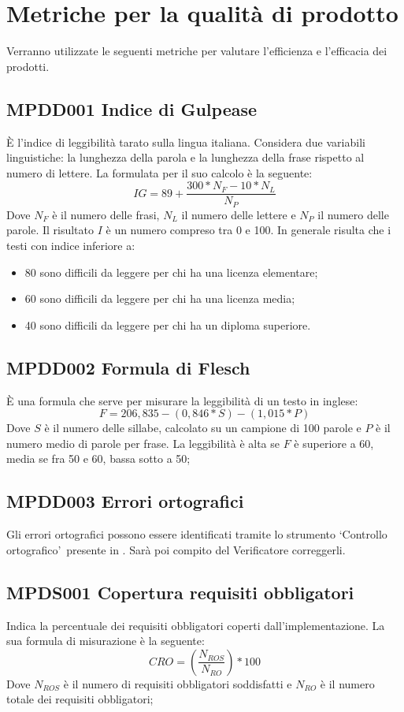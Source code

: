 \documentclass[NormeDiProgetto.tex]{subfiles}
\begin{document}
\section{Metriche per la qualità di prodotto}
Verranno utilizzate le seguenti metriche per valutare l'efficienza e l'efficacia dei prodotti.
\subsection{MPDD001 Indice di Gulpease} \`{E} l'indice di leggibilità tarato sulla lingua italiana. Considera due variabili linguistiche: la lunghezza della parola e la lunghezza della frase rispetto al numero di lettere. La formulata per il suo calcolo è la seguente:
\[IG=89+\dfrac{300*N_F-10*N_L}{N_P}\] Dove $ N_F $ è il numero delle frasi, $ N_L $ il numero delle lettere e $ N_P $ il numero delle parole. Il risultato $I$ è un numero compreso tra 0 e 100. In generale risulta che i testi con indice inferiore a:
\begin{itemize}
	\item 80 sono difficili da leggere per chi ha una licenza elementare;
	\item 60 sono difficili da leggere per chi ha una licenza media;
	\item 40 sono difficili da leggere per chi ha un diploma superiore.
\end{itemize}	
\subsection {MPDD002 Formula di Flesch} \`{E} una formula che serve per misurare la leggibilità di un testo in inglese:
\[F=206,835-(0,846*S)-(1,015*P)\] Dove $ S $ è il numero delle sillabe, calcolato su un campione di 100 parole e $ P $ è il numero medio di parole per frase.
La leggibilità è alta se $F$ è superiore a 60, media se fra 50 e 60, bassa sotto a 50;
\subsection{MPDD003 Errori ortografici} Gli errori ortografici possono essere identificati tramite lo strumento \textquoteleft Controllo ortografico\textquoteright\ presente in . Sarà poi compito del Verificatore correggerli.  	


\subsection{MPDS001 Copertura requisiti obbligatori} Indica la percentuale dei requisiti obbligatori coperti dall'implementazione. La sua formula di misurazione è la seguente: \[CRO=(\frac{N_{ROS}}{N_{RO}})*100\] Dove $ N_{ROS} $ è il numero di requisiti obbligatori soddisfatti e $ N_{RO} $ è il numero totale dei requisiti obbligatori;
\end{document}
